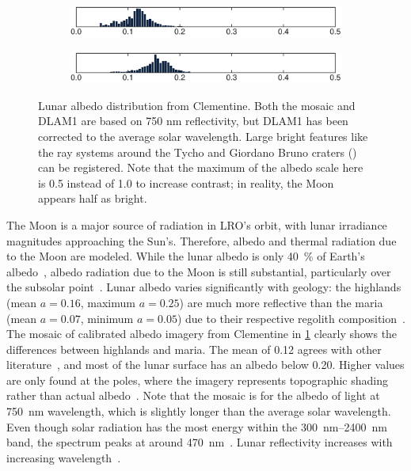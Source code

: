 \begin{figure}[t]
    \begin{subfigure}[c]{0.49\textwidth}
        \includegraphics[width=\textwidth]{figures/plots/lunar_hist_photo.pdf}
        \label{fig:lunar-albedo-map-photo}
    \end{subfigure}
   \hfill
    \begin{subfigure}[c]{0.49\textwidth}
        \includegraphics[width=\textwidth]{figures/plots/lunar_hist_dlam1.pdf}
        \label{fig:lunar-albedo-map-dlam1}
    \end{subfigure}

   \caption{Lunar albedo distribution from Clementine. Both the mosaic and \acrshort{DLAM1} are based on 750 nm reflectivity, but \acrshort{DLAM1} has been corrected to the average solar wavelength. Large bright features like the ray systems around the Tycho and Giordano Bruno craters (\textcolor{mpl-pink}{}) can be registered. Note that the maximum of the albedo scale here is 0.5 instead of 1.0 to increase contrast; in reality, the Moon appears half as bright.}
   \label{fig:lunar-albedo-map}
\end{figure}

The Moon is a major source of radiation in \gls{LRO}'s orbit, with lunar irradiance magnitudes approaching the Sun's. Therefore, albedo and thermal radiation due to the Moon are modeled. While the lunar albedo is only \qty{40}{\percent} of Earth's albedo~\cite{Goode2001}, albedo radiation due to the Moon is still substantial, particularly over the subsolar point~\cite{Floberghagen1999}. Lunar albedo varies significantly with geology: the highlands (mean $a = 0.16$, maximum $a=0.25$) are much more reflective than the maria (mean $a = 0.07$, minimum $a = 0.05$) due to their respective regolith composition~\cite{Vasavada2012,Hayne2017,Sato2014}. The mosaic of calibrated albedo imagery from Clementine in \cref{fig:lunar-albedo-map-photo} clearly shows the differences between highlands and maria. The mean of 0.12 agrees with other literature~\cite{Vasavada2012}, and most of the lunar surface has an albedo below 0.20. Higher values are only found at the poles, where the imagery represents topographic shading rather than actual albedo~\cite{McEwen1997}. Note that the mosaic is for the albedo of light at \qty{750}{\nm} wavelength, which is slightly longer than the average solar wavelength. Even though solar radiation has the most energy within the \qtyrange{300}{2400}{\nm} band, the spectrum peaks at around \qty{470}{\nm}~\cite{Iqbal1983}. Lunar reflectivity increases with increasing wavelength~\cite{Shkuratov2011}.

